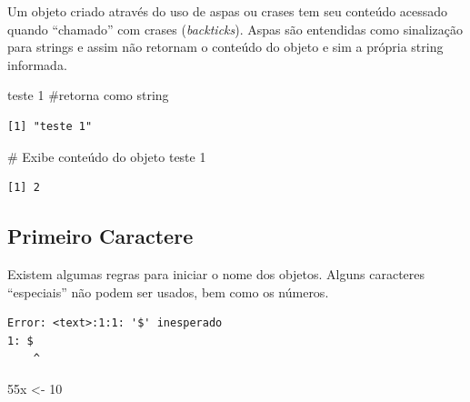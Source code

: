 \documentclass[
  letterpaper,
  DIV=11,
  numbers=noendperiod]{scrreprt}
\newenvironment{Shaded}{\begin{snugshade}}{\end{snugshade}}
\newcommand{\AttributeTok}[1]{\textcolor[rgb]{0.40,0.45,0.13}{#1}}
\newcommand{\CommentTok}[1]{\textcolor[rgb]{0.37,0.37,0.37}{#1}}
\newcommand{\DecValTok}[1]{\textcolor[rgb]{0.68,0.00,0.00}{#1}}
\newcommand{\NormalTok}[1]{\textcolor[rgb]{0.00,0.23,0.31}{#1}}
\newcommand{\OtherTok}[1]{\textcolor[rgb]{0.00,0.23,0.31}{#1}}
\newcommand{\SpecialCharTok}[1]{\textcolor[rgb]{0.37,0.37,0.37}{#1}}
\newcommand{\StringTok}[1]{\textcolor[rgb]{0.13,0.47,0.30}{#1}}
\begin{document}
Um objeto criado através do uso de aspas ou crases tem seu conteúdo
acessado quando ``chamado'' com crases (\emph{backticks}). Aspas são
entendidas como sinalização para strings e assim não retornam o conteúdo
do objeto e sim a própria string informada.

\begin{Shaded}
\begin{Highlighting}[]
\StringTok{\textquotesingle{}teste 1\textquotesingle{}} \CommentTok{\#retorna como string}
\end{Highlighting}
\end{Shaded}

\begin{verbatim}
[1] "teste 1"
\end{verbatim}

\begin{Shaded}
\begin{Highlighting}[]
\CommentTok{\# Exibe conteúdo do objeto}
\StringTok{\textasciigrave{}}\AttributeTok{teste 1}\StringTok{\textasciigrave{}}
\end{Highlighting}
\end{Shaded}

\begin{verbatim}
[1] 2
\end{verbatim}

\hypertarget{primeiro-caractere}{%
\subsection{Primeiro Caractere}\label{primeiro-caractere}}

Existem algumas regras para iniciar o nome dos objetos. Alguns
caracteres ``especiais'' não podem ser usados, bem como os números.

\begin{Shaded}
\end{Shaded}

\begin{verbatim}
Error: <text>:1:1: '$' inesperado
1: $
    ^
\end{verbatim}

\begin{Shaded}
\begin{Highlighting}[]
\NormalTok{55x }\OtherTok{\textless{}{-}} \DecValTok{10} 
\end{Highlighting}
\end{Shaded}
\end{document}
